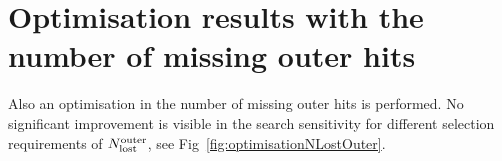 \clearpage
\section{Optimisation results with the number of missing outer hits}
\label{app:OptimisationNLostOuter}

Also an optimisation in the number of missing outer hits is performed. 
No significant improvement is visible in the search sensitivity for different selection requirements of $N_{\text{lost}}^{\text{outer}}$, see Fig~\ref{fig:optimisationNLostOuter}.  
